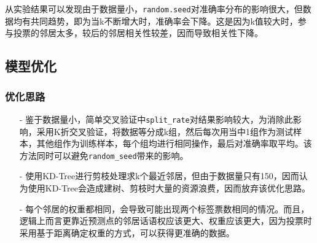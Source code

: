 \documentclass[utf-8]{article}
\begin{document}
从实验结果可以发现由于数据量小，\verb|random.seed|对准确率分布的影响很大，但数据均有共同趋势，即为当k不断增大时，准确率会下降。这是因为k值较大时，参与投票的邻居太多，较后的邻居相关性较差，因而导致相关性下降。

\subsection{模型优化}

\subsubsection{优化思路}
\begin{itemize}
	\item [-] 鉴于数据量小，简单交叉验证中\verb|split_rate|对结果影响较大，为消除此影响，采用K折交叉验证，将数据等分成k组，然后每次用当中1组作为测试样本，其他组作为训练样本，每个组均进行相同操作，最后对准确率取平均。该方法同时可以避免\verb|random_seed|带来的影响。
	\item [-] 使用KD-Tree进行剪枝处理求k个最近邻居，但由于数据量只有150，因而认为使用KD-Tree会造成建树、剪枝时大量的资源浪费，因而放弃该优化思路。
	\item [-] 每个邻居的权重都相同，会导致可能出现两个标签票数相同的情况。而且，逻辑上而言更靠近预测点的邻居话语权应该更大、权重应该更大，因为投票时采用基于距离确定权重的方式，可以获得更准确的数据。
\end{itemize}
\end{document}
